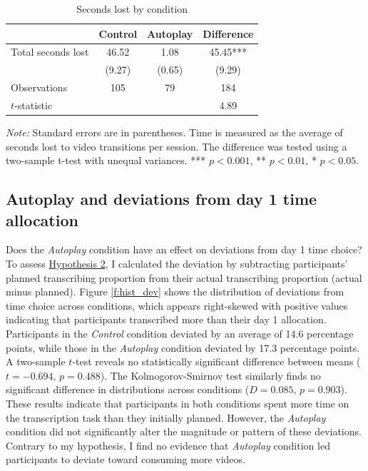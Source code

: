 \documentclass[11pt,a4paper,oneside]{article}
\begin{document}
\begin{table}[H]
  \centering
  \caption{Seconds lost by condition}
  \begin{threeparttable}
  \begin{tabular*}{\textwidth}{@{\extracolsep{\fill}}lccc}
  \toprule
  & Control & Autoplay & Difference \\
  \midrule
  Total seconds lost & 46.52 & 1.08 & 45.45*** \\
  & (9.27) & (0.65) & (9.29) \\
  \midrule
  Observations & 105 & 79 & 184 \\
  $t$-statistic & & & 4.89 \\
  \bottomrule
  \end{tabular*}
  \begin{tablenotes}[flushleft]
  \footnotesize
  \item[] \textit{Note:} Standard errors are in parentheses. Time is measured as the average of seconds lost to video transitions per session. The difference was tested using a two-sample t-test with unequal variances. *** $p<0.001$, ** $p<0.01$, * $p<0.05$.
  \end{tablenotes}
  \end{threeparttable}
  \label{tab:total_transition_time}
\end{table}

\subsection{Autoplay and deviations from day 1 time allocation}
Does the \textit{Autoplay} condition have an effect on deviations from day 1 time choice? To assess \hyperref[hypotheses]{Hypothesis 2}, I calculated the deviation by subtracting participants' planned transcribing proportion from their actual transcribing proportion (actual minus planned). Figure \ref{f:hist_dev} shows the distribution of deviations from time choice across conditions, which appears right-skewed with positive values indicating that participants transcribed more than their day 1 allocation. Participants in the \textit{Control} condition deviated by an average of 14.6 percentage points, while those in the \textit{Autoplay} condition deviated by 17.3 percentage points. A two-sample $t$-test reveals no statistically significant difference between means ($t = -0.694$, $p = 0.488$). The Kolmogorov-Smirnov test similarly finds no significant difference in distributions across conditions ($D = 0.085$, $p = 0.903$). These results indicate that participants in both conditions spent more time on the transcription task than they initially planned. However, the \textit{Autoplay} condition did not significantly alter the magnitude or pattern of these deviations. Contrary to my hypothesis, I find no evidence that \textit{Autoplay} condition led participants to deviate toward consuming more videos.
\end{document}
